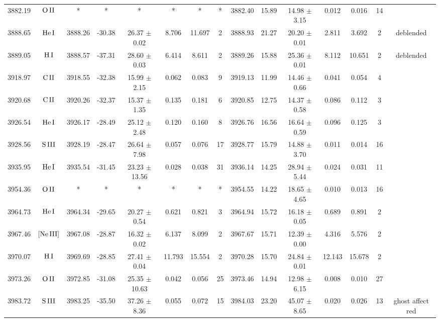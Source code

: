 \documentclass{article}
\begin{document}
\begin{table*}
\begin{adjustbox}{width=\textwidth}
\begin{tabular}{ccccccccccccccc}
3882.19 & $\mbox{O}\thinspace \mbox{II}$ & * & * & * & * & * & * & 3882.40 & 15.89 & 14.98 $\pm$ 3.15 & 0.012 & 0.016 & 14 &  \\
3888.65 & $\mbox{He}\thinspace \mbox{I}$ & 3888.26 & -30.38 & 26.37 $\pm$ 0.02 & 8.706 & 11.697 & 2 & 3888.93 & 21.27 & 20.20 $\pm$ 0.01 & 2.811 & 3.692 & 2 &  deblended \\
3889.05 & $\mbox{H}\thinspace \mbox{I}$ & 3888.57 & -37.31 & 28.60 $\pm$ 0.03 & 6.414 & 8.611 & 2 & 3889.26 & 15.88 & 25.36 $\pm$ 0.01 & 8.112 & 10.651 & 2 &  deblended \\
3918.97 & $\mbox{C}\thinspace \mbox{II}$ & 3918.55 & -32.38 & 15.99 $\pm$ 2.15 & 0.062 & 0.083 & 9 & 3919.13 & 11.99 & 14.46 $\pm$ 0.66 & 0.041 & 0.054 & 4 &  \\
3920.68 & $\mbox{C}\thinspace \mbox{II}$ & 3920.26 & -32.37 & 15.37 $\pm$ 1.35 & 0.135 & 0.181 & 6 & 3920.85 & 12.75 & 14.37 $\pm$ 0.58 & 0.086 & 0.112 & 3 &  \\
3926.54 & $\mbox{He}\thinspace \mbox{I}$ & 3926.17 & -28.49 & 25.12 $\pm$ 2.48 & 0.120 & 0.160 & 8 & 3926.76 & 16.56 & 16.64 $\pm$ 0.59 & 0.096 & 0.125 & 3 &  \\
3928.56 & $\mbox{S}\thinspace \mbox{III}$ & 3928.19 & -28.47 & 26.64 $\pm$ 7.98 & 0.057 & 0.076 & 17 & 3928.77 & 15.79 & 14.88 $\pm$ 3.70 & 0.011 & 0.014 & 16 &  \\
3935.95 & $\mbox{He}\thinspace \mbox{I}$ & 3935.54 & -31.45 & 23.23 $\pm$ 13.56 & 0.028 & 0.038 & 31 & 3936.14 & 14.25 & 28.94 $\pm$ 5.44 & 0.024 & 0.031 & 11 &  \\
3954.36 & $\mbox{O}\thinspace \mbox{II}$ & * & * & * & * & * & * & 3954.55 & 14.22 & 18.65 $\pm$ 4.65 & 0.010 & 0.013 & 16 &  \\
3964.73 & $\mbox{He}\thinspace \mbox{I}$ & 3964.34 & -29.65 & 20.27 $\pm$ 0.54 & 0.621 & 0.821 & 3 & 3964.94 & 15.72 & 16.18 $\pm$ 0.05 & 0.689 & 0.891 & 2 &  \\
3967.46 & $\mbox{[Ne}\thinspace \mbox{III]}$ & 3967.08 & -28.87 & 16.32 $\pm$ 0.02 & 6.137 & 8.099 & 2 & 3967.67 & 15.71 & 12.39 $\pm$ 0.00 & 4.316 & 5.576 & 2 &  \\
3970.07 & $\mbox{H}\thinspace \mbox{I}$ & 3969.69 & -28.85 & 27.41 $\pm$ 0.04 & 11.793 & 15.554 & 2 & 3970.28 & 15.70 & 24.84 $\pm$ 0.01 & 12.143 & 15.678 & 2 &  \\
3973.26 & $\mbox{O}\thinspace \mbox{II}$ & 3972.85 & -31.08 & 25.35 $\pm$ 10.63 & 0.042 & 0.056 & 25 & 3973.46 & 14.94 & 12.98 $\pm$ 6.15 & 0.008 & 0.010 & 27 &  \\
3983.72 & $\mbox{S}\thinspace \mbox{III}$ & 3983.25 & -35.50 & 37.26 $\pm$ 8.36 & 0.055 & 0.072 & 15 & 3984.03 & 23.20 & 45.07 $\pm$ 8.65 & 0.020 & 0.026 & 13 &  ghost affect red \\

\end{tabular}
\end{adjustbox}
\end{table*}
\end{document}
